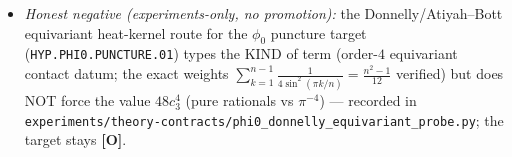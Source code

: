 \documentclass[11pt]{article}
\providecommand{\mO}{\textbf{[O]}}\providecommand{\mX}{\textbf{[X]}}
\providecommand{\cthree}{c_3}\providecommand{\phiz}{\varphi_0^{\mathrm{ret}}}
\providecommand{\Mbar}{\bar M_{\mathrm{Pl}}}\providecommand{\Z}{\mathbb{Z}}\providecommand{\PP}{\mathbb{P}}
\begin{document}
\begin{itemize}[leftmargin=1.5em]
gate: the integer rung $M_R{=}\cthree^3\Mbar$ predicts $m_3{=}0.030$ eV --- $40\%$ low at $1$-loop
($\kappa$ run-down $0.794$) --- the ladder pin is DECLINED per \texttt{v354}/\texttt{v355}; the decision
computation is named ($2$-loop SM $+$ explicit PS thresholds). What survives: a \emph{one}-parameter,
window-bracketed \mO\ candidate with the falsifiable band $m_3\in[0.002,0.115]$ eV and the NO floor
$\Sigma m_\nu{=}0.059$ eV; frozen record untouched. Integrated in \texttt{tfpt\_2\_standard\_model} (new
paragraph after \texttt{v272}), \texttt{introduction} status card (third named candidate),
\texttt{tfpt\_5\_redteam}; ledger rows \texttt{FLAV.NUSCALE.02} $+$ \texttt{FLAV.NUSCALE.01} update note;
Python-only by nature.
\item \emph{Honest negative (experiments-only, no promotion):} the Donnelly/Atiyah--Bott equivariant
heat-kernel route for the $\phi_0$ puncture target (\texttt{HYP.PHI0.PUNCTURE.01}) types the KIND of term
(order-$4$ equivariant contact datum; the exact weights $\sum_{k=1}^{n-1}\tfrac1{4\sin^2(\pi k/n)}
{=}\tfrac{n^2-1}{12}$ verified) but does NOT force the value $48\cthree^4$ (pure rationals vs $\pi^{-4}$)
--- recorded in \texttt{experiments/theory-contracts/phi0\_donnelly\_equivariant\_probe.py}; the target
stays \mO.
\end{itemize}
\end{document}
